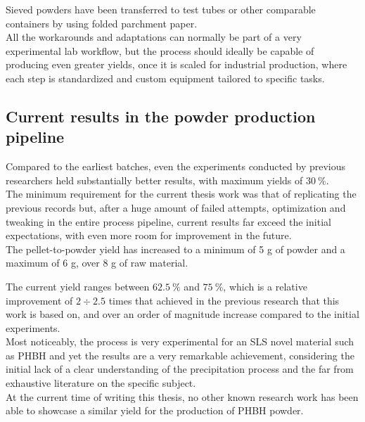 \documentclass[a4paper]{article}
\begin{document}
        Sieved powders have been transferred to test tubes or other comparable containers by using folded parchment paper. \\ 

        
        All the workarounds and adaptations can normally be part of a very experimental lab workflow, but the process should ideally 
        be capable of producing even greater yields, once it is scaled for industrial production, where each step is standardized 
        and custom equipment tailored to specific tasks. 

        \clearpage

        \subsection{Current results in the powder production pipeline \label{promising_results}}

        Compared to the earliest batches, even the experiments conducted by previous researchers held substantially better 
        results, with maximum yields of $30 \ \%$. \\ 

        The minimum requirement for the current thesis work was that of replicating the previous records but, after 
        a huge amount of failed attempts, optimization and tweaking in the entire process pipeline, current results 
        far exceed the initial expectations, with even more room for improvement in the future. \\ 

        The pellet-to-powder yield has increased to a minimum of 5 g of powder and a maximum of 6 g, over 8 g of raw material. 

        The current yield ranges between $62.5 \ \%$ and $75 \ \%$, which is a relative improvement of $2 \div 2.5$ times that 
        achieved in the previous research that this work is based on, and over an order of magnitude increase compared to the 
        initial experiments. \\ 

        Most noticeably, the process is very experimental for an SLS novel material such as PHBH and yet the results are 
        a very remarkable achievement, considering the initial lack of a clear understanding of the precipitation process 
        and the far from exhaustive literature on the specific subject. \\ 

        At the current time of writing this thesis, no other known research work has been able to showcase a similar yield 
        for the production of PHBH powder. \\  
\end{document}
